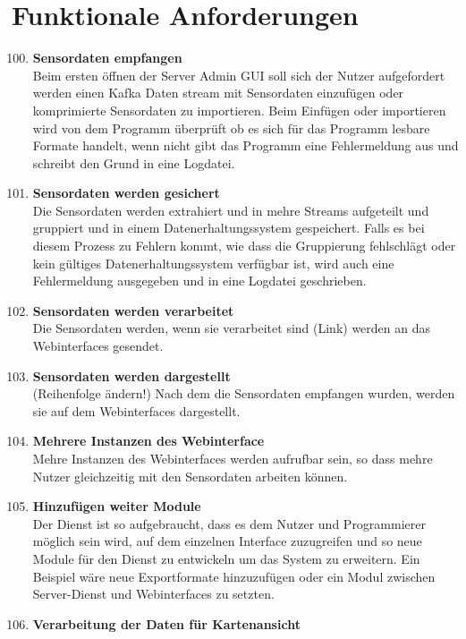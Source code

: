 \chapter{Funktionale Anforderungen}
\begin{enumerate}[label=\textbf{PF\arabic{enumi}0}]
	\setcounter{enumi}{99}
	\item \textbf{Sensordaten empfangen}\\
		Beim ersten öffnen der Server Admin GUI soll sich der Nutzer aufgefordert werden einen Kafka Daten stream mit Sensordaten einzufügen oder komprimierte Sensordaten zu importieren. Beim Einfügen oder importieren wird von dem Programm überprüft ob es sich für das Programm lesbare Formate handelt, wenn nicht gibt das Programm eine Fehlermeldung aus und schreibt den Grund in eine Logdatei.  
	\item \textbf{Sensordaten werden gesichert}\\
		Die Sensordaten werden extrahiert und in mehre Streams aufgeteilt und gruppiert und in einem Datenerhaltungssystem gespeichert. Falls es bei diesem Prozess zu Fehlern kommt, wie dass die Gruppierung fehlschlägt oder kein gültiges Datenerhaltungssystem verfügbar ist, wird auch eine Fehlermeldung ausgegeben und in eine Logdatei geschrieben.
	\item \textbf{Sensordaten werden verarbeitet}\\
		Die Sensordaten werden, wenn sie verarbeitet sind (Link) werden an das Webinterfaces gesendet.
	\item \textbf{Sensordaten werden dargestellt}\\
		(Reihenfolge ändern!) 
		Nach dem die Sensordaten empfangen wurden, werden sie auf dem Webinterfaces dargestellt.
	\item \textbf{Mehrere Instanzen des Webinterface}\\
	 	Mehre Instanzen des Webinterfaces werden aufrufbar sein, so dass mehre Nutzer gleichzeitig mit den Sensordaten arbeiten können.
	 \item \textbf{Hinzufügen weiter Module}\\
	 Der Dienst ist so aufgebraucht, dass es dem Nutzer und Programmierer möglich sein wird, auf dem einzelnen Interface zuzugreifen und so neue Module für den Dienst zu entwickeln um das System zu erweitern. Ein Beispiel wäre neue Exportformate hinzuzufügen oder ein Modul zwischen Server-Dienst und Webinterfaces zu setzten. 
	 \item \textbf{Verarbeitung der Daten für Kartenansicht}\\

\end{enumerate}
